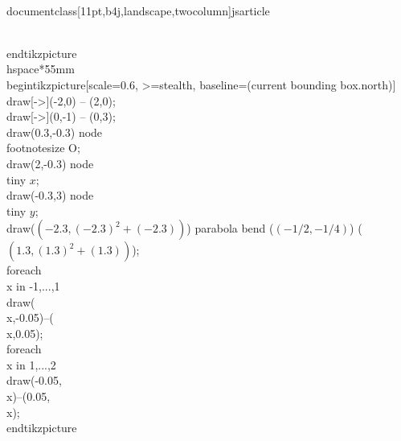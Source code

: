\\documentclass[11pt,b4j,landscape,twocolumn]{jsarticle}
\begin{document}
\\end{tikzpicture}
%
\\hspace*{55mm}
%
\\begin{tikzpicture}[scale=0.6, >=stealth, baseline=(current bounding box.north)]
\\draw[->](-2,0) -- (2,0);
\\draw[->](0,-1) -- (0,3);
\\draw(0.3,-0.3) node {\\footnotesize O};
\\draw(2,-0.3) node {\\tiny $x$};
\\draw(-0.3,3) node {\\tiny $y$};
\\draw($ (-2.3,{(-2.3)^2+(-2.3)}) $) parabola bend ($ ({-1/2},{-1/4}) $) ($ (1.3,{(1.3)^2+(1.3)}) $);
\\foreach \\x in {-1,...,1}{\\draw(\\x,-0.05)--(\\x,0.05);}
\\foreach \\x in {1,...,2}{\\draw(-0.05,\\x)--(0.05,\\x);}
\\end{tikzpicture}
\end{document}
